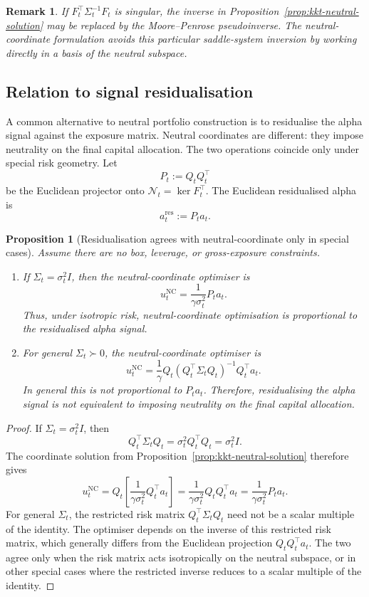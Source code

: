 \documentclass[11pt]{article}
\newtheorem{proposition}{Proposition}
\newtheorem{remark}{Remark}
\newcommand{\N}{\mathcal{N}}
\begin{document}
\begin{remark}
If $F_t^\top\Sigma_t^{-1}F_t$ is singular, the inverse in
Proposition~\ref{prop:kkt-neutral-solution} may be replaced by the Moore--Penrose pseudoinverse.  The
neutral-coordinate formulation avoids this particular saddle-system inversion by working directly in a
basis of the neutral subspace.
\end{remark}

\subsection{Relation to signal residualisation}

A common alternative to neutral portfolio construction is to residualise the alpha signal against the
exposure matrix.  Neutral coordinates are different: they impose neutrality on the final capital
allocation.  The two operations coincide only under special risk geometry.  Let
\[
        P_t:=Q_tQ_t^\top
\]
be the Euclidean projector onto $\N_t=\ker F_t^\top$.  The Euclidean residualised alpha is
\[
        a_t^{\mathrm{res}} := P_ta_t.
\]

\begin{proposition}[Residualisation agrees with neutral-coordinate only in special cases]
\label{prop:residualisation-equivalence}
Assume there are no box, leverage, or gross-exposure constraints.
\begin{enumerate}[leftmargin=1.5em]
\item If $\Sigma_t=\sigma_t^2I$, then the neutral-coordinate optimiser is
\[
        u_t^{\mathrm{NC}}=\frac{1}{\gamma\sigma_t^2}P_ta_t.
\]
Thus, under isotropic risk, neutral-coordinate optimisation is proportional to the residualised alpha signal.
\item For general $\Sigma_t\succ0$, the neutral-coordinate optimiser is
\[
        u_t^{\mathrm{NC}}=\frac{1}{\gamma}Q_t(Q_t^\top\Sigma_tQ_t)^{-1}Q_t^\top a_t.
\]
In general this is not proportional to $P_ta_t$.  Therefore, residualising the alpha signal is not
equivalent to imposing neutrality on the final capital allocation.
\end{enumerate}
\end{proposition}

\begin{proof}
If $\Sigma_t=\sigma_t^2I$, then
\[
        Q_t^\top\Sigma_tQ_t=\sigma_t^2 Q_t^\top Q_t=\sigma_t^2 I.
\]
The coordinate solution from Proposition~\ref{prop:kkt-neutral-solution} therefore gives
\[
        u_t^{\mathrm{NC}}
        =Q_t\left[\frac{1}{\gamma\sigma_t^2}Q_t^\top a_t\right]
        =\frac{1}{\gamma\sigma_t^2}Q_tQ_t^\top a_t
        =\frac{1}{\gamma\sigma_t^2}P_ta_t.
\]
For general $\Sigma_t$, the restricted risk matrix $Q_t^\top\Sigma_tQ_t$ need not be a scalar multiple
of the identity.  The optimiser depends on the inverse of this restricted risk matrix, which generally
differs from the Euclidean projection $Q_tQ_t^\top a_t$.  The two agree only when the risk matrix acts
isotropically on the neutral subspace, or in other special cases where the restricted inverse reduces to a
scalar multiple of the identity.
\end{proof}
\end{document}
